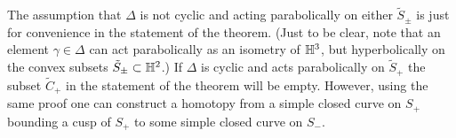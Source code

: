 \documentclass[12pt]{amsart}
\theoremstyle{definition}
\theoremstyle{remark}
\begin{document}
The assumption that $\Delta$ is not cyclic and acting parabolically on either $\tilde S_\pm$ is just for convenience in the statement of the theorem. (Just to be clear, note that an element $\gamma\in \Delta$ can act parabolically as an isometry of $\mathbb H^3$, but hyperbolically on the convex subsets $\tilde S_\pm \subset \mathbb H^2$.) If $\Delta$ is cyclic and acts parabolically on $\tilde S_+$ the subset $\tilde C_+$ in the statement of the theorem will be empty. However, using the same proof one can construct a homotopy from a simple closed curve on $S_+$ bounding a cusp of $S_+$ to some simple closed curve on $S_-$.


\end{document}
